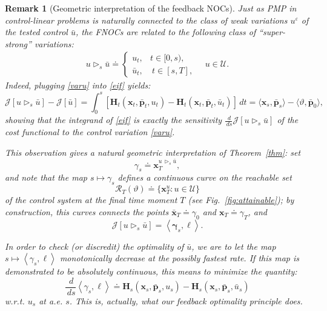 \documentclass[sn-mathphys-num]{sn-jnl}
\numberwithin{equation}{section}
\theoremstyle{mythm}
\theoremstyle{mydef}
\newtheorem{remark}[proposition]{Remark}
\renewcommand{\epsilon}{\varepsilon}
\renewcommand{\d}{\,d}
\begin{document}
\begin{remark}[Geometric interpretation of the feedback NOCs]

Just as PMP  in control-linear problems is naturally connected to the class of weak variations $u^\epsilon$ of the tested  control $\bar u$, the FNOCs are related to the following class of ``super-strong'' variations:
\begin{align}\label{varu}
    u \triangleright_s \bar u \doteq \left\{
    \begin{array}{cc}
    u_t,  & t \in [0,s),\\
    \bar u_t, & \ t \in [s,T],\end{array} 
    \right. \quad u \in \mathcal U.
\end{align}
Indeed, plugging \eqref{varu} into \eqref{eif} yields:
\[
    \mathcal J[u \triangleright_s \bar u] - \mathcal J[\bar u] =  
    \int_0^s \left[\bm H_t(\bm x_t,  \bar{\bm p}_t, u_t) - \bm H_t(\bm x_t,  \bar{\bm p}_t, \bar  u_t)\right] \d t = \langle \bm x_s, \bar{\bm p}_s\rangle - \langle \vartheta, \bar{\bm p}_0\rangle,
\]
showing that the integrand of \eqref{eif} is exactly the sensitivity $\frac{\d}{\d s} \mathcal J[u \triangleright_s \bar u]$ of the cost functional to the control variation \eqref{varu}. 

This observation gives a natural geometric interpretation of Theorem~\ref{thm}: set
\[
\gamma_s \doteq \bm x_T^{u \, \triangleright_s \bar u},
\] 
and note that the map \(s \mapsto \gamma_s\) defines a continuous curve on the \emph{reachable set} \[\mathcal R_T(\vartheta) \doteq \{\bm x_T^{u}\colon u \in {\mathcal U} \}
\] of the control system  at the final time moment $T$ (see Fig.~\ref{fig:attainable}); by construction, this curves connects the points $\bar{\bm x}_T \doteq \gamma_0$ and $\bm x_T \doteq \gamma_T$, and \[\mathcal J[u \triangleright_s \bar u] = \left\langle \bm \gamma_s, \ell\right\rangle.\] 

In order to check (or discredit) the optimality of $\bar u$, we are to let the map $s \mapsto \left\langle \gamma_s, \ell\right\rangle$ monotonically decrease at the possibly fastest rate. If this map is demonstrated to be absolutely continuous, this means to minimize the quantity:
\[
    \frac{\d}{\d s}\left\langle \gamma_s, \ell\right\rangle \doteq \bm H_s(\bm x_s,  \bar{\bm p}_s, u_s) - \bm H_s(\bm x_s,  \bar{\bm p}_s, \bar  u_s) 
\]
w.r.t. $u_s$ at a.e. $s$. This is, actually, what our feedback optimality principle does. 
\end{remark}
\end{document}
